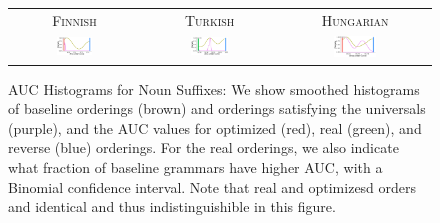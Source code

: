 \documentclass[11pt,letterpaper]{article}
\begin{document}
\begin{figure}
\begin{tabular}{ccc}
\textsc{Finnish} & \textsc{Turkish} & \textsc{Hungarian} \\
    \includegraphics[width=0.3\textwidth]{figures/finnish_nouns/suffixes-byMorphemes-auc-hist-heldout-Coarse-FineSurprisal-optimized.pdf}
    &
    \includegraphics[width=0.3\textwidth]{figures/turkish_nouns/suffixes-byMorphemes-auc-hist-heldout-Coarse-FineSurprisal-optimized.pdf}
    &
    \includegraphics[width=0.3\textwidth]{figures/hungarian_nouns/suffixes-byMorphemes-auc-hist-heldout-Coarse-FineSurprisal-optimized.pdf}
    \end{tabular}
    \caption{AUC Histograms for Noun Suffixes: We show smoothed histograms of baseline orderings (brown) and orderings satisfying the universals (purple), and the AUC values for optimized (red), real (green), and reverse (blue) orderings. For the real orderings, we also indicate what fraction of baseline grammars have higher AUC, with a Binomial confidence interval. Note that real and optimizesd orders and identical and thus indistinguishible in this figure. }
    \label{fig:auc_nouns}
\end{figure}
\end{document}
